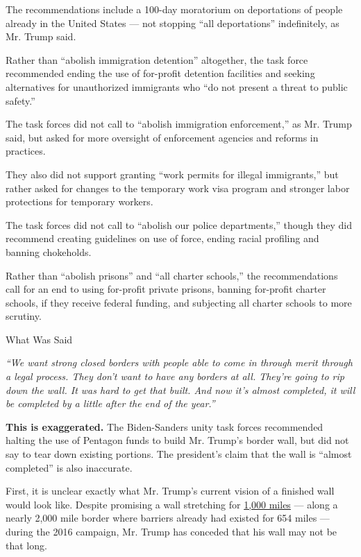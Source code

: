 The recommendations include a 100-day moratorium on deportations of
people already in the United States --- not stopping ``all
deportations'' indefinitely, as Mr. Trump said.

Rather than ``abolish immigration detention'' altogether, the task force
recommended ending the use of for-profit detention facilities and
seeking alternatives for unauthorized immigrants who ``do not present a
threat to public safety.''

The task forces did not call to ``abolish immigration enforcement,'' as
Mr. Trump said, but asked for more oversight of enforcement agencies and
reforms in practices.

They also did not support granting ``work permits for illegal
immigrants,'' but rather asked for changes to the temporary work visa
program and stronger labor protections for temporary workers.

The task forces did not call to ``abolish our police departments,''
though they did recommend creating guidelines on use of force, ending
racial profiling and banning chokeholds.

Rather than ``abolish prisons'' and ``all charter schools,'' the
recommendations call for an end to using for-profit private prisons,
banning for-profit charter schools, if they receive federal funding, and
subjecting all charter schools to more scrutiny.

What Was Said

\emph{``We want strong closed borders with people able to come in
through merit through a legal process. They don't want to have any
borders at all. They're going to rip down the wall. It was hard to get
that built. And now it's almost completed, it will be completed by a
little after the end of the year.''}

\textbf{This is exaggerated.} The Biden-Sanders unity task forces
recommended halting the use of Pentagon funds to build Mr. Trump's
border wall, but did not say to tear down existing portions. The
president's claim that the wall is ``almost completed'' is also
inaccurate.

First, it is unclear exactly what Mr. Trump's current vision of a
finished wall would look like. Despite promising a wall stretching for
\href{https://www.nytimes3xbfgragh.onion/2018/01/18/us/politics/trump-border-wall-immigration.html}{1,000
miles} --- along a nearly 2,000 mile border where barriers already had
existed for 654 miles --- during the 2016 campaign, Mr. Trump has
conceded that his wall may not be that long.

